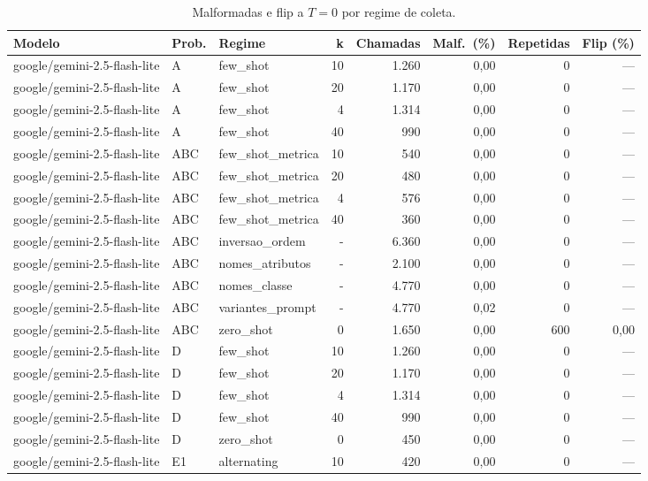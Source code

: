 \begin{table}[htbp]
\centering
\small
\caption{Malformadas e flip a $T=0$ por regime de coleta.}
\label{tab:T5_flip}
\begin{tabular}{lllrrrrr}
\toprule
Modelo & Prob. & Regime & k & Chamadas & Malf.\ (\%) & Repetidas & Flip (\%) \\
\midrule
google/gemini-2.5-flash-lite & A & few\_shot & 10 & 1.260 & 0,00 & 0 & — \\
google/gemini-2.5-flash-lite & A & few\_shot & 20 & 1.170 & 0,00 & 0 & — \\
google/gemini-2.5-flash-lite & A & few\_shot & 4 & 1.314 & 0,00 & 0 & — \\
google/gemini-2.5-flash-lite & A & few\_shot & 40 & 990 & 0,00 & 0 & — \\
google/gemini-2.5-flash-lite & ABC & few\_shot\_metrica & 10 & 540 & 0,00 & 0 & — \\
google/gemini-2.5-flash-lite & ABC & few\_shot\_metrica & 20 & 480 & 0,00 & 0 & — \\
google/gemini-2.5-flash-lite & ABC & few\_shot\_metrica & 4 & 576 & 0,00 & 0 & — \\
google/gemini-2.5-flash-lite & ABC & few\_shot\_metrica & 40 & 360 & 0,00 & 0 & — \\
google/gemini-2.5-flash-lite & ABC & inversao\_ordem & - & 6.360 & 0,00 & 0 & — \\
google/gemini-2.5-flash-lite & ABC & nomes\_atributos & - & 2.100 & 0,00 & 0 & — \\
google/gemini-2.5-flash-lite & ABC & nomes\_classe & - & 4.770 & 0,00 & 0 & — \\
google/gemini-2.5-flash-lite & ABC & variantes\_prompt & - & 4.770 & 0,02 & 0 & — \\
google/gemini-2.5-flash-lite & ABC & zero\_shot & 0 & 1.650 & 0,00 & 600 & 0,00 \\
google/gemini-2.5-flash-lite & D & few\_shot & 10 & 1.260 & 0,00 & 0 & — \\
google/gemini-2.5-flash-lite & D & few\_shot & 20 & 1.170 & 0,00 & 0 & — \\
google/gemini-2.5-flash-lite & D & few\_shot & 4 & 1.314 & 0,00 & 0 & — \\
google/gemini-2.5-flash-lite & D & few\_shot & 40 & 990 & 0,00 & 0 & — \\
google/gemini-2.5-flash-lite & D & zero\_shot & 0 & 450 & 0,00 & 0 & — \\
google/gemini-2.5-flash-lite & E1 & alternating & 10 & 420 & 0,00 & 0 & — \\

\end{tabular}
\end{table}

